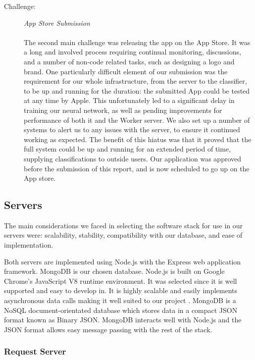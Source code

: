 \documentclass[a4paper,11pt]{article}
\begin{document}
\begin{description}
\item [Challenge:] \textit{App Store Submission}\\\\
The second main challenge was releasing the app on the App Store. It was a long and involved process requiring continual monitoring, discussions, and a number of non-code related tasks, such as designing a logo and brand. One particularly difficult element of our submission was the requirement for our whole infrastructure, from the server to the classifier, to be up and running for the duration: the submitted App could be tested at any time by Apple. This unfortunately led to a significant delay in training our neural network, as well as pending improvements for performance of both it and the Worker server.  We also set up a number of systems to alert us to any issues with the server, to ensure it continued working as expected. The benefit of this hiatus was that it proved that the full system could be up and running for an extended period of time, supplying classifications to outside users. Our application was approved before the submission of this report, and is now scheduled to go up on the App store.
\end{description}

\subsection{Servers}

The main considerations we faced in selecting the software stack for use in our servers were: scalability, stability, compatibility with our database, and ease of implementation.

Both servers are implemented using Node.js with the Express web application framework. MongoDB is our chosen database. Node.js is built on Google Chrome's JavaScript V8 runtime environment. It was selected since it is well supported and easy to develop in. It is highly scalable and easily implements asynchronous data calls making it well suited to our project \cite{nodejsabout}. MongoDB is a NoSQL document-orientated database which stores data in a compact JSON format known as Binary JSON. MongoDB interacts well with Node.js and the JSON format allows easy message passing with the rest of the stack.

\subsubsection{Request Server}
\end{document}
